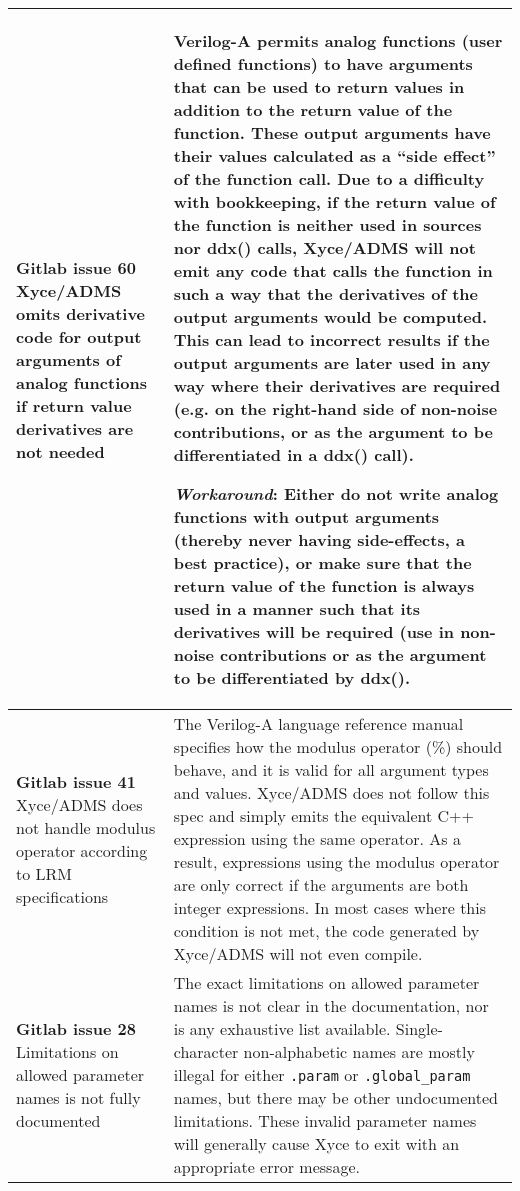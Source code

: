 {\begin{longtable}[h] {>{\raggedright\small}m{2in}|>{\raggedright\let\\\tabularnewline\small}m{3.5in}}
\textbf{Gitlab issue 60} Xyce/ADMS omits derivative code for output arguments of analog functions if return value derivatives are not needed &
Verilog-A permits analog functions (user defined functions) to have arguments that can be used to return values in addition to the return value of the function.  These output arguments have their values calculated as a ``side effect'' of the function call.  Due to a difficulty with bookkeeping, if the return value of the function is neither used in sources nor ddx() calls, Xyce/ADMS will not emit any code that calls the function in such a way that the derivatives of the output arguments would be computed.  This can lead to incorrect results if the output arguments are later used in any way where their derivatives are required (e.g. on the right-hand side of non-noise contributions, or as the argument to be differentiated in a ddx() call).

\textbf{\textit{Workaround}}:
Either do not write analog functions with output arguments (thereby
never having side-effects, a best practice), or make sure that the
return value of the function is always used in a manner such that its
derivatives will be required (use in non-noise contributions or as
the argument to be differentiated by ddx().

\\ \hline
\textbf{Gitlab issue 41} Xyce/ADMS does not handle modulus operator according to LRM specifications &
The Verilog-A language reference manual specifies how the modulus
operator (\%) should behave, and it is valid for all argument types
and values.  Xyce/ADMS does not follow this spec and simply emits the
equivalent C++ expression using the same operator.  As a result,
expressions using the modulus operator are only correct if the
arguments are both integer expressions.  In most cases where this
condition is not met, the code generated by Xyce/ADMS will not even
compile.  \\ \hline

\textbf{Gitlab issue 28} Limitations on allowed parameter names is not fully documented &
The exact limitations on allowed parameter names is not clear in the
documentation, nor is any exhaustive list available.  Single-character
non-alphabetic names are mostly illegal for either \texttt{.param}
or \texttt{.global\_param} names, but there may be other undocumented
limitations.  These invalid parameter names will generally cause Xyce
to exit with an appropriate error message.  \\ \hline


\end{longtable}}
